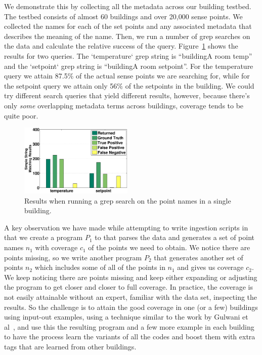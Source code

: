 We demonstrate this by collecting all the metadata across our building
testbed.  The testbed consists of almost 60 buildings and over 20,000 sense points.  We collected
the names for each of the set points and any associated metadata that describes the meaning
of the name.  Then, we run a number of grep searches on the data and calculate the 
relative success of the query.  Figure~\ref{fig:sodagrep} shows the results for two queries.
The `temperature` grep string is ``buildingA room temp'' and the `setpoint` grep string
is ``buildingA room setpoint''.  For the temperature query we attain 87.5\% of the 
actual sense points we are searching for, while for the setpoint query we attain only 56\%
of the setpoints in the building.  We could try different search queries that yield different
results, however, because there's only \emph{some} overlapping metadata terms across
buildings, coverage tends to be quite poor.

\begin{figure}[h!]
\centering
    \includegraphics[width=0.48\textwidth]{figs/soda_grep_result.eps}
    \caption{Results when running a grep search on the point names in a single building.}
\label{fig:sodagrep}
\end{figure}

A key observation we have made while attempting to write ingestion scripts in that 
we create a program $P_{1}$ to that parses the data and generates a set of point names
$n_{1}$ with coverage $c_{1}$ of the points we need to obtain.  We notice there are
points missing, so we write another program $P_{2}$ that generates another set of points
$n_{2}$ which includes some of all of the points in $n_{1}$ and gives us coverage $c_{2}$.
We keep noticing there are points missing and keep either expanding or adjusting
the program to get closer and closer to full coverage.  In practice, the coverage is not
easily attainable without an expert, familiar with the data set, inspecting the results.
So the challenge is to attain the good coverage in one (or a few) buildings using input-out
examples, using a technique similar
to the work by Gulwani et al~\cite{Gulwani:2011}, and use this the resulting program and
a few more example in each building to have the process learn the variants of all the codes
and boost them with extra tags that are learned from other buildings.

